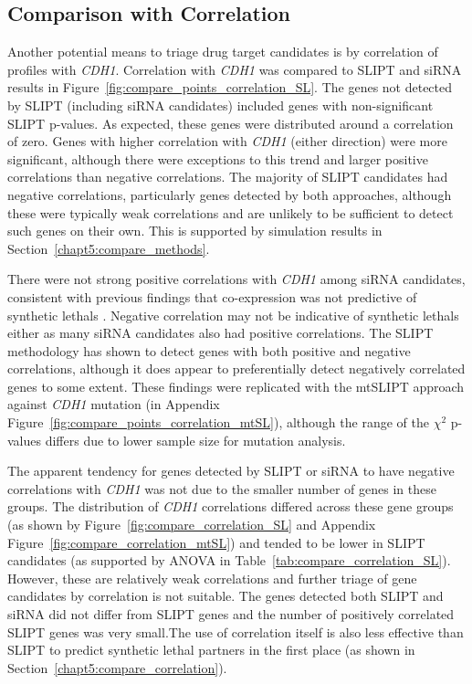 \subsection{Comparison with Correlation} \label{chapt3:compare_correlation} 

Another potential means to triage drug target candidates is by correlation of  profiles with \textit{CDH1}. Correlation with \textit{CDH1} was compared to \gls{SLIPT} and \gls{siRNA} results in Figure~\ref{fig:compare_points_correlation_SL}. The genes not detected by \gls{SLIPT} (including \gls{siRNA} candidates) included genes with non-significant \gls{SLIPT} p-values. As expected, these genes were distributed around a correlation of zero. Genes with higher correlation with \textit{CDH1} (either direction) were more significant, although there were exceptions to this trend and larger positive correlations than negative correlations. The majority of \gls{SLIPT} candidates had negative correlations, particularly genes detected by both approaches, although these were typically weak correlations and are unlikely to be sufficient to detect such genes on their own. This is supported by simulation results in Section~\ref{chapt5:compare_methods}.



There were not strong positive correlations with \textit{CDH1} among \gls{siRNA} candidates, consistent with previous findings that co-expression was not predictive of \glspl{synthetic lethal} \citep{Jerby2014, Lu2015}. Negative correlation may not be indicative of \glspl{synthetic lethal} either as many \gls{siRNA} candidates also had positive correlations. The \gls{SLIPT} methodology has shown to detect genes with both positive and negative correlations, although it does appear to preferentially detect negatively correlated genes to some extent. These findings were replicated with the \acrshort{mtSLIPT} approach against \textit{CDH1} \gls{mutation} (in Appendix Figure~\ref{fig:compare_points_correlation_mtSL}), although the range of the $\chi^2$ p-values differs due to lower sample size for \gls{mutation} analysis.

\FloatBarrier

The apparent tendency for genes detected by \gls{SLIPT} or \gls{siRNA} to have negative correlations with \textit{CDH1}  was not due to the smaller number of genes in these groups. The distribution of \textit{CDH1} correlations differed across these gene groups (as shown by Figure~\ref{fig:compare_correlation_SL} and Appendix Figure~\ref{fig:compare_correlation_mtSL}) and tended to be lower in \gls{SLIPT} candidates (as supported by \gls{ANOVA} in Table~\ref{tab:compare_correlation_SL}). However, these are relatively weak correlations and further triage of gene candidates by correlation is not suitable. The genes detected both \gls{SLIPT} and \gls{siRNA} did not differ from \gls{SLIPT} genes and the number of positively correlated \gls{SLIPT} genes was very small.The use of correlation itself is also less effective than \gls{SLIPT} to predict \gls{synthetic lethal} partners in the first place (as shown in Section~\ref{chapt5:compare_correlation}).

